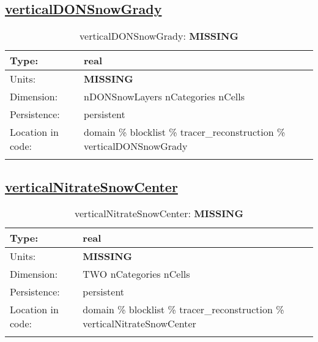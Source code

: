 \subsection[verticalDONSnowGrady]{\hyperref[sec:var_tab_tracer_reconstruction]{verticalDONSnowGrady}}
\label{subsec:var_sec_tracer_reconstruction_verticalDONSnowGrady}
\begin{center}
\begin{longtable}{| p{2.0in} | p{4.0in} |}
        \hline 
        Type: & real \\
        \hline 
        Units: & {\bf \color{red} MISSING} \\
        \hline 
        Dimension: & nDONSnowLayers nCategories nCells \\
        \hline 
        Persistence: & persistent \\
        \hline 
         Location in code: & domain \% blocklist \% tracer\_reconstruction \% verticalDONSnowGrady \\
         \hline 
    \caption{verticalDONSnowGrady: {\bf \color{red} MISSING}}
\end{longtable}
\end{center}
\subsection[verticalNitrateSnowCenter]{\hyperref[sec:var_tab_tracer_reconstruction]{verticalNitrateSnowCenter}}
\label{subsec:var_sec_tracer_reconstruction_verticalNitrateSnowCenter}
\begin{center}
\begin{longtable}{| p{2.0in} | p{4.0in} |}
        \hline 
        Type: & real \\
        \hline 
        Units: & {\bf \color{red} MISSING} \\
        \hline 
        Dimension: & TWO nCategories nCells \\
        \hline 
        Persistence: & persistent \\
        \hline 
         Location in code: & domain \% blocklist \% tracer\_reconstruction \% verticalNitrateSnowCenter \\
         \hline 
    \caption{verticalNitrateSnowCenter: {\bf \color{red} MISSING}}
\end{longtable}
\end{center}
